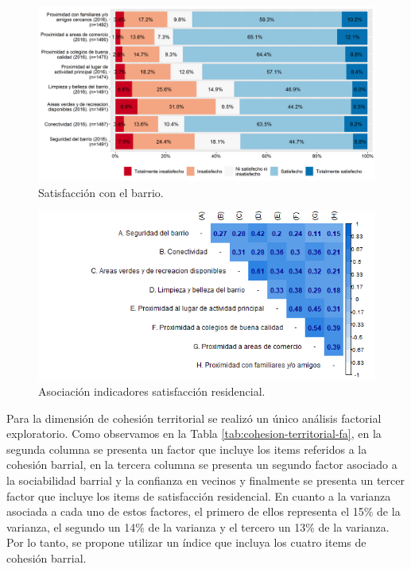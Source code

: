 \documentclass[
  12pt,
]{book}
\begin{document}
\begin{figure}[H]

{\centering \includegraphics[width=1\linewidth,height=1\textheight]{output/graphs/satisfaccion-residencial} 

}

\caption{Satisfacción con el barrio.}\label{fig:satisfaccion-residencial}
\end{figure}

\begin{figure}[H]

{\centering \includegraphics[width=1\linewidth,height=1\textheight]{output/graphs/satisfaccion-residencial_cor} 

}

\caption{Asociación indicadores satisfacción residencial.}\label{fig:satisfaccion-residencial-cor}
\end{figure}

Para la dimensión de cohesión territorial se realizó un único análisis factorial exploratorio. Como observamos en la Tabla \ref{tab:cohesion-territorial-fa}, en la segunda columna se presenta un factor que incluye los items referidos a la cohesión barrial, en la tercera columna se presenta un segundo factor asociado a la sociabilidad barrial y la confianza en vecinos y finalmente se presenta un tercer factor que incluye los items de satisfacción residencial. En cuanto a la varianza asociada a cada uno de estos factores, el primero de ellos representa el 15\% de la varianza, el segundo un 14\% de la varianza y el tercero un 13\% de la varianza. Por lo tanto, se propone utilizar un índice que incluya los cuatro items de cohesión barrial.
\end{document}
